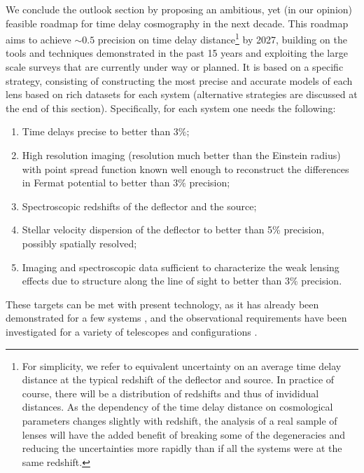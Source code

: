 We conclude the outlook section by proposing an ambitious, yet (in our
opinion) feasible roadmap for time delay cosmography in the next
decade. This roadmap aims to achieve $\sim0.5$ precision on time delay
distance\footnote{For simplicity, we refer to equivalent uncertainty
on an average time delay distance at the typical redshift of the
deflector and source. In practice of course, there will be a
distribution of redshifts and thus of invididual distances. As the
dependency of the time delay distance on cosmological parameters
changes slightly with redshift, the analysis of a real sample of
lenses will have the added benefit of breaking some of the
degeneracies and reducing the uncertainties more rapidly than if all
the systems were at the same redshift.} by 2027,
building on the tools and techniques demonstrated in
the past 15 years and exploiting the large scale surveys that are
currently under way or planned. It is based on a specific strategy,
consisting of constructing the most precise and accurate models of
each lens based on rich datasets for each system (alternative
strategies are discussed at the end of this section). Specifically,
for each system one needs the following:

\begin{enumerate}
\item Time delays precise to better than $3\%$;
\item High resolution imaging (resolution much better than the Einstein
radius) with point spread function known well enough to reconstruct the
differences in Fermat potential to better than $3\%$ precision;
\item Spectroscopic redshifts of the deflector and the source;
\item Stellar velocity dispersion of the deflector to better than 5\%
precision, possibly spatially resolved;
\item Imaging and spectroscopic data sufficient to characterize the
weak lensing effects due to structure along the line of sight to better than
$3\%$ precision.
\end{enumerate}

These targets can be met with present technology, as it has already
been demonstrated for a few systems \citep{Tew++13,Suy++13}, and the
observational requirements have been investigated for a variety of
telescopes and configurations
\citep{Gre++13,CollettEtal2013,Men++15,Lin15}.


